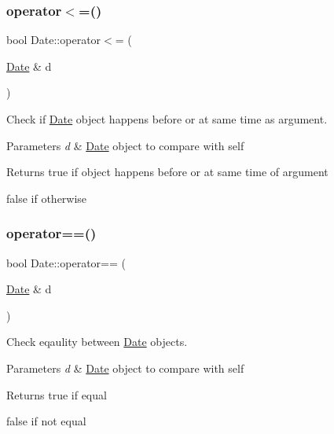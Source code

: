 \subsubsection{\texorpdfstring{operator$<$=()}{operator<=()}}
{\footnotesize\ttfamily bool Date\+::operator$<$= (\begin{DoxyParamCaption}\item[{\mbox{\hyperlink{classDate}{Date}} \&}]{d }\end{DoxyParamCaption})}



Check if \mbox{\hyperlink{classDate}{Date}} object happens before or at same time as argument. 


\begin{DoxyParams}{Parameters}
{\em d} & \mbox{\hyperlink{classDate}{Date}} object to compare with self \\
\hline
\end{DoxyParams}
\begin{DoxyReturn}{Returns}
true if object happens before or at same time of argument 

false if otherwise 
\end{DoxyReturn}
\mbox{\label{classDate_a91ccc0361527f5f68785c5460d750a12}} 
\subsubsection{\texorpdfstring{operator==()}{operator==()}}
{\footnotesize\ttfamily bool Date\+::operator== (\begin{DoxyParamCaption}\item[{\mbox{\hyperlink{classDate}{Date}} \&}]{d }\end{DoxyParamCaption})}



Check eqaulity between \mbox{\hyperlink{classDate}{Date}} objects. 


\begin{DoxyParams}{Parameters}
{\em d} & \mbox{\hyperlink{classDate}{Date}} object to compare with self \\
\hline
\end{DoxyParams}
\begin{DoxyReturn}{Returns}
true if equal 

false if not equal 
\end{DoxyReturn}
\mbox{\label{classDate_a0c2a1a6f890da1f9a360fab87e7109a3}} 

